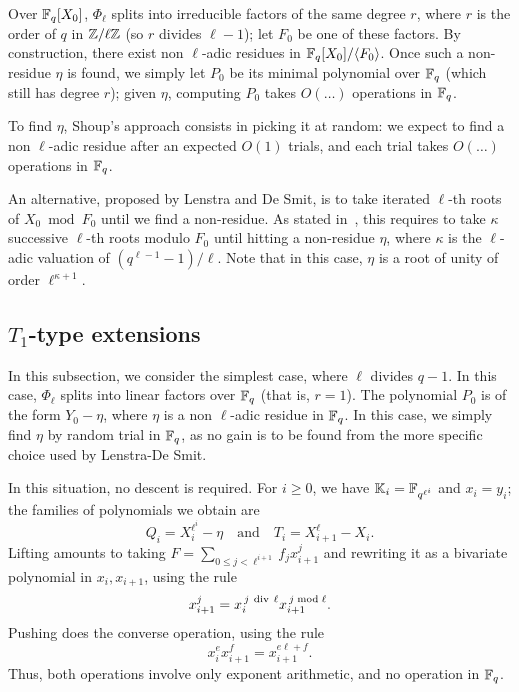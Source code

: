 \documentclass{sig-alternate}
\newcommand{\Cyc}{\Phi}  %
\begin{document}
Over $\mathbb{F}_q[X_0]$, $\Cyc_\ell$ splits into irreducible factors of the
same degree $r$, where $r$ is the order of $q$ in $\mathbb{Z}/\ell\mathbb{Z}$ (so $r$
divides $\ell-1$); let $F_0$ be one of these factors. By construction,
there exist non $\ell$-adic residues in $\mathbb{F}_q[X_0]/\langle F_0
\rangle$. Once such a non-residue $\eta$ is found, we simply let $P_0$
be its minimal polynomial over $\mathbb{F}_q$ (which still has degree $r$);
given $\eta$, computing $P_0$ takes $O(\dots)$ operations in $\mathbb{F}_q$.

To find $\eta$, Shoup's approach consists in picking it at random: we
expect to find a non $\ell$-adic residue after an expected $O(1)$
trials, and each trial takes $O(\dots)$ operations in $\mathbb{F}_q$.

An alternative, proposed by Lenstra and De Smit, is to take iterated
$\ell$-th roots of $X_0 \bmod F_0$ until we find a non-residue. As
stated in~\cite{lenstra+desmit08-stdmodels}, this requires to take
$\kappa$ successive $\ell$-th roots modulo $F_0$ until hitting a
non-residue $\eta$, where $\kappa$ is the $\ell$-adic valuation of
$(q^{\ell-1}-1)/\ell$. Note that in this case, $\eta$ is a root of
unity of order $\ell^{\kappa+1}$.


\subsection{$T_1$-type extensions}\label{ssec:T1}

In this subsection, we consider the simplest case, where $\ell$
divides $q-1$. In this case, $\Phi_\ell$ splits into linear factors
over $\mathbb{F}_q$ (that is, $r=1$). The polynomial $P_0$ is of the form
$Y_0-\eta$, where $\eta$ is a non $\ell$-adic residue in $\mathbb{F}_q$. In
this case, we simply find $\eta$ by random trial in $\mathbb{F}_q$, as no gain
is to be found from the more specific choice used by Lenstra-De Smit.

In this situation, no descent is required. For $i \ge 0$, we have
$\mathbb{K}_i=\mathbb{F}_{q^{\ell^i}}$ and $x_i=y_i$; the families of polynomials we
obtain are
$$Q_i=X_i^{\ell^i}-\eta \quad\text{and}\quad T_i=X_{i+1}^\ell-X_i.$$
Lifting amounts to taking $F = \sum_{0 \le j < \ell^{i+1}} f_j
x_{i+1}^j$ and rewriting it as a bivariate polynomial in
$x_i,x_{i+1}$, using the rule
$$x_{i+1}^j = x_i^{\,j {\rm~div~} \ell} x_{i+1}^{\,j \bmod \ell}.$$
Pushing does the converse operation, using the rule
$$x_i^e x_{i+1}^f = x_{i+1}^{e \ell + f}.$$ Thus, both operations
involve only exponent arithmetic, and no operation in $\mathbb{F}_q$.
\end{document}
